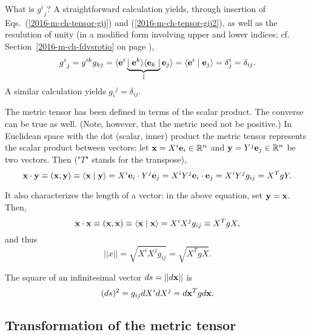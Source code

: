 What is  ${g^i}_{j}$?
A straightforward calculation yields, through insertion of Eqs.~(\ref{2016-m-ch-tensor-gij}) and (\ref{2016-m-ch-tensor-gij2}),
as well as the resulution of unity (in a modified form involving upper and lower indices;
cf. Section~\ref{2016-m-ch-fdvsrotio} on page \pageref{2016-m-ch-fdvsrotio}),
\begin{equation}
{g^i}_{j} = g^{ik}g_{kj}  =
\langle {\bf e}^i \underbrace{\mid {\bf e}^k \rangle \langle {\bf e}_k \mid}_{{\Bbb I}} {\bf e}_j\rangle
= \langle {\bf e}^i \mid {\bf e}_j\rangle
= \delta^i_j = \delta_{ij}.
\label{2014-m-ch-tensor-deltag}
\end{equation}
A similar calculation yields ${g_i}^{j} = \delta_{ij}$.


The metric tensor has been defined in terms of the scalar product.
The converse can be true as well.
(Note, however, that the metric need not be positive.)
In Euclidean space with the dot (scalar, inner) product
the metric tensor represents the scalar product between vectors: let
${\bf x}=X^i{\bf e}_i \in {\Bbb R}^n$ and ${\bf y}=Y^j{\bf e}_j \in {\Bbb R}^n$ be two vectors.
Then ("$T$" stands for the transpose),
\begin{equation}
{\bf x}\cdot {\bf y}\equiv ({\bf x},{\bf y})\equiv \langle {\bf x}\mid {\bf y}\rangle
= X^i {\bf e}_i\cdot Y^j {\bf e}_j
= X^iY^j {\bf e}_i\cdot  {\bf e}_j
=X^iY^j g_{ij}= X^T g Y.
\end{equation}

It also characterizes the length of a vector: in the above
equation, set ${\bf y}={\bf x}$. Then,
\begin{equation}
{\bf x}\cdot {\bf x}\equiv ({\bf x},{\bf x})\equiv \langle {\bf x}\mid {\bf x}\rangle
=X^iX^j g_{ij}\equiv X^T g X,
\end{equation}
and thus
\begin{equation}
\vert\vert  x\vert\vert  =\sqrt{X^iX^j g_{ij}}= \sqrt{X^T g X}.
\end{equation}


The square of an infinitesimal vector $ds =\vert\vert d{\bf x} \vert\vert $ is
\begin{equation}
(d s)^2  = g_{ij}dX^i dX^j= d{\bf x}^T g d{\bf x}.
\end{equation}




\subsection{Transformation of the metric tensor}

